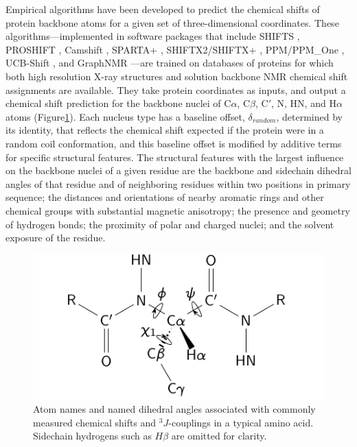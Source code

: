 \documentclass[9pt,review]{livecoms}
\begin{document}
Empirical algorithms have been developed to predict the chemical shifts of protein backbone atoms for a given set of three-dimensional coordinates.
These algorithms---implemented in software packages that include SHIFTS \cite{xu_automated_2001}, PROSHIFT \cite{meiler_proshift_2003}, Camshift \cite{kohlhoff_fast_2009}, SPARTA+ \cite{shen_sparta_2010}, SHIFTX2/SHIFTX+ \cite{han_shiftx2_2011}, PPM/PPM\_One \cite{li_ppm_2012,li_ppm_one_2015}, UCB-Shift \cite{li_accurate_2020}, and GraphNMR \cite{yang_predicting_2021}---are trained on databases of proteins for which both high resolution X-ray structures and solution backbone NMR chemical shift assignments are available.
They take protein coordinates as inputs, and output a chemical shift prediction for the backbone nuclei of C$\alpha$, C$\beta$, C$'$, N, HN, and H$\alpha$ atoms (Figure\ref{fig:dihedrals}).
Each nucleus type has a baseline offset, $\delta_{random}$, determined by its identity, that reflects the chemical shift expected if the protein were in a random coil conformation, and this baseline offset is modified by additive terms for specific structural features.
The structural features with the largest influence on the backbone nuclei of a given residue are the backbone and sidechain dihedral angles of that residue and of neighboring residues within two positions in primary sequence; the distances and orientations of nearby aromatic rings and other chemical groups with substantial magnetic anisotropy; the presence and geometry of hydrogen bonds; the proximity of polar and charged nuclei; and the solvent exposure of the residue.

\begin{figure}[t]
    \centering
    \includegraphics[width=3 in]{paper/figures/protein-dihedrals.pdf}
    \caption{Atom names and named dihedral angles associated with commonly measured chemical shifts and $^3J$-couplings in a typical amino acid.
    Sidechain hydrogens such as $H\beta$ are omitted for clarity.}
    \label{fig:dihedrals}
\end{figure}
\end{document}
